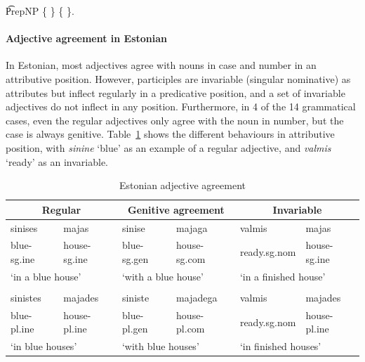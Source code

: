 \begin{EmptyItem}
\t{PrepNP} \{  \}
           \{  \}.
\end{EmptyItem}

\paragraph{Adjective agreement in Estonian} In Estonian,
most adjectives agree with nouns in case and number in an attributive
position. However, participles are invariable (singular nominative) as
attributes but inflect regularly in a predicative position, and a set
of invariable adjectives do not inflect in any position. Furthermore,
in 4 of the 14 grammatical cases, even the regular adjectives only
agree with the noun in number, but the case is always genitive.
Table~\ref{estonian} shows the different behaviours in attributive
position, with \emph{sinine} `blue' as an example of a regular
adjective, and \emph{valmis} `ready' as an invariable.

\begin{table}[h]
\small
\begin{tabular}{ll | ll | ll}

\multicolumn{2}{c|}{\bf Regular} & \multicolumn{2}{c|}{\bf Genitive
                                   agreement} & \multicolumn{2}{c}{\bf
                                                Invariable} \\ \hline
 sinises & majas &  sinise & majaga &  valmis & majas \\
blue-{\sc sg.ine} & house-{\sc sg.ine} & blue-{\sc sg.gen} & house-{\sc sg.com} &  ready.{\sc sg.nom} & house-{\sc sg.ine} \\
\multicolumn{2}{l|}{`in a blue house'} & \multicolumn{2}{l|}{`with a blue house'} & \multicolumn{2}{l}{`in a finished house'} \\
 & & & & & \\
sinistes & majades & siniste & majadega & valmis & majades \\
blue-{\sc pl.ine} & house-{\sc pl.ine} & blue-{\sc pl.gen} & house-{\sc pl.com} & ready.{\sc sg.nom} & house-{\sc pl.ine} \\
\multicolumn{2}{l|}{`in blue houses'} & \multicolumn{2}{l|}{`with blue
                                         houses'} &
                                                     \multicolumn{2}{l}{`in finished houses'}

\end{tabular}
\caption{Estonian adjective agreement}
\label{estonian}
\end{table}

